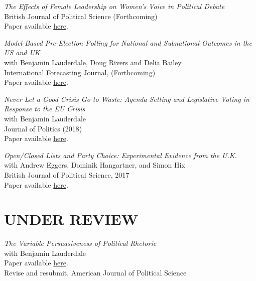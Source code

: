 \documentclass[centered]{res}
\begin{document}
\begin{resume}
{\sl The Effects of Female Leadership on Women's Voice in Political Debate} \\
British Journal of Political Science (Forthcoming) \\
Paper available \href{https://www.cambridge.org/core/journals/british-journal-of-political-science/article/effects-of-female-leadership-on-womens-voice-in-political-debate/146CC7A7C2965ACBEC82BC328BD2D5F2} {here}.

{\sl Model-Based Pre-Election Polling for National and Subnational Outcomes in the US and UK} \\
with Benjamin Lauderdale, Doug Rivers and Delia Bailey\\ 
International Forecasting Journal, (Forthcoming)\\
Paper available \href{https://www.sciencedirect.com/science/article/abs/pii/S016920701930189X} {here}.

{\sl Never Let a Good Crisis Go to Waste: Agenda Setting and Legislative Voting in Response to the EU Crisis} \\
with Benjamin Lauderdale\\
Journal of Politics (2018)\\
Paper available \href{https://www.journals.uchicago.edu/doi/abs/10.1086/694543} {here}.


{\sl Open/Closed Lists and Party Choice: Experimental Evidence from the U.K.}\\with Andrew Eggers, Dominik Hangartner, and Simon Hix \\
British Journal of Political Science, 2017\\
Paper available \href{http://journals.cambridge.org/action/displayFulltext?type=1&fid=10345643&jid=JPS&volumeId=-1&issueId=-1&aid=10345638} {here}.

\section{UNDER REVIEW} 

{\sl The Variable Persuasiveness of Political Rhetoric} \\
with Benjamin Lauderdale\\
Paper available \href{https://www.jackblumenau.com/papers/persuasion.pdf} {here}.\\
Revise and resubmit, American Journal of Political Science


\end{resume}
\end{document}
